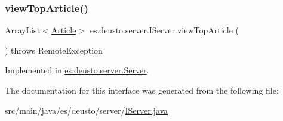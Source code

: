 \subsubsection{\texorpdfstring{view\+Top\+Article()}{viewTopArticle()}}
{\footnotesize\ttfamily Array\+List$<$\hyperlink{classes_1_1deusto_1_1server_1_1jdo_1_1_article}{Article}$>$ es.\+deusto.\+server.\+I\+Server.\+view\+Top\+Article (\begin{DoxyParamCaption}{ }\end{DoxyParamCaption}) throws Remote\+Exception}



Implemented in \hyperlink{classes_1_1deusto_1_1server_1_1_server_ada6d55bcd79444de821eaeb6b21c44b8}{es.\+deusto.\+server.\+Server}.



The documentation for this interface was generated from the following file\+:\begin{DoxyCompactItemize}
\item 
src/main/java/es/deusto/server/\hyperlink{_i_server_8java}{I\+Server.\+java}\end{DoxyCompactItemize}
